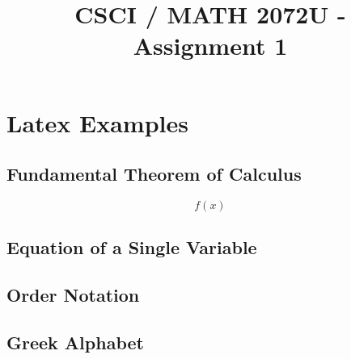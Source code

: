 \documentclass{article}
\title{CSCI / MATH 2072U - Assignment 1}
\author{ }         %
\date{ }           %
\begin{document}
\maketitle

\section{Latex Examples}

\subsection{Fundamental Theorem of Calculus}
 

\[
f(x)
\]

\subsection{Equation of a Single Variable}
  
  
 \subsection{Order Notation}
 

\subsection{Greek Alphabet}
 
\end{document}
